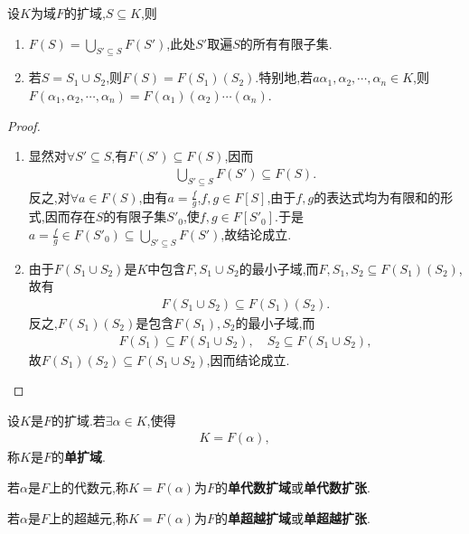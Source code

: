 \documentclass[../../main.tex]{subfiles}%
\begin{document}
\begin{theorem}
设$K$为域$F$的扩域,$S\subseteq K$,则
\begin{enumerate}[(1)]
\item $F(S)=\bigcup\limits_{S'\subseteq S}F(S')$,此处$S'$取遍$S$的所有有限子集.

\item 若$S=S_1\cup S_2$,则$F(S)=F(S_1)(S_2)$.特别地,若$a\alpha_1,\alpha_2,\cdots,\alpha_n\in K$,则$F(\alpha_1,\alpha_2,\cdots,\alpha_n)=F(\alpha_1)(\alpha_2)\cdots(\alpha_n)$.
\end{enumerate}
\end{theorem}

\begin{proof}
\begin{enumerate}[(1)]
\item 显然对$\forall S'\subseteq S$,有$F(S')\subseteq F(S)$,因而
\begin{align*}
\bigcup\limits_{S'\subseteq S}F(S')\subseteq F(S).
\end{align*}
反之,对$\forall a\in F(S)$,由有$a=\frac{f}{g}$,$f,g\in F[S]$,由于$f,g$的表达式均为有限和的形式,因而存在$S$的有限子集$S'_0$,使$f,g\in F[S'_0]$.于是$a=\frac{f}{g}\in F(S'_0)\subseteq\bigcup\limits_{S'\subseteq S}F(S')$,故结论成立.

\item 由于$F(S_1\cup S_2)$是$K$中包含$F,S_1\cup S_2$的最小子域,而$F,S_1,S_2\subseteq F(S_1)(S_2)$,故有
\begin{align*}
F(S_1\cup S_2)\subseteq F(S_1)(S_2).
\end{align*}
反之,$F(S_1)(S_2)$是包含$F(S_1),S_2$的最小子域,而
\begin{align*}
F(S_1)\subseteq F(S_1\cup S_2),\quad S_2\subseteq F(S_1\cup S_2),
\end{align*}
故$F(S_1)(S_2)\subseteq F(S_1\cup S_2)$,因而结论成立.
\end{enumerate}

\end{proof}

\begin{definition}
设$K$是$F$的扩域.若$\exists\alpha\in K$,使得
\begin{align*}
K=F(\alpha),
\end{align*}
称$K$是$F$的\textbf{单扩域}.

若$\alpha$是$F$上的代数元,称$K=F(\alpha)$为$F$的\textbf{单代数扩域}或\textbf{单代数扩张}.

若$\alpha$是$F$上的超越元,称$K=F(\alpha)$为$F$的\textbf{单超越扩域}或\textbf{单超越扩张}.
\end{definition}
\end{document}
